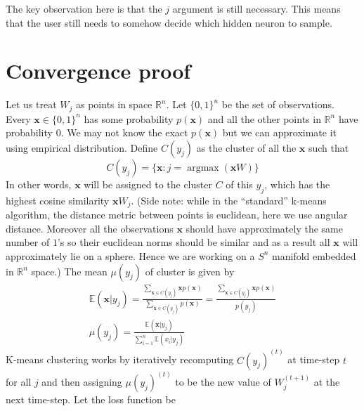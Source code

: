\documentclass[12pt]{article}
\DeclareMathOperator*{\argmax}{argmax}
\begin{document}
The key observation here is that the $j$ argument is still necessary. This means that the user still needs to somehow decide which hidden neuron to sample.



\section{Convergence proof}

Let us treat $W_j$ as points in space $\mathbb{R}^n$. Let $\{0,1\}^n$  be the set of observations. Every $\boldsymbol{x}\in \{0,1\}^n$ has some probability $p(\boldsymbol{x})$ and all the other points in $\mathbb{R}^n$ have probability $0$. We may not know the exact $p(\boldsymbol{x})$ but we can approximate it using empirical distribution. Define $C(y_j)$ as the cluster of all the $\boldsymbol{x}$ such that
\[
 C(y_j) = \{\boldsymbol{x} :  j = \argmax(\boldsymbol{x} W) \} 
\]
In other words, $\boldsymbol{x}$ will be assigned to the cluster $C$ of this  $y_j$, which has the highest cosine similarity $\boldsymbol{x}W_j$. (Side note: while in the ``standard'' k-means algorithm, the distance metric between points is euclidean, here we use angular distance. Moreover all the observations $\boldsymbol{x}$ should have approximately the same number of $1$'s so their euclidean norms should be similar and as a result all $\boldsymbol{x}$ will approximately lie on a sphere.  Hence we are working on a $S^n$ manifold embedded in $\mathbb{R}^n$ space.)  The mean $\mu(y_j)$ of cluster is given by 
\begin{gather*}
	\mathbb{E}(\boldsymbol{x}|y_j) = \frac{\sum_{\boldsymbol{x}\in C(y_j)} \boldsymbol{x}p(\boldsymbol{x})}{\sum_{\boldsymbol{x}\in C(y_j)} p(\boldsymbol{x})} = \frac{\sum_{\boldsymbol{x}\in C(y_j)} \boldsymbol{x}p(\boldsymbol{x})}{p(y_j)} \\
	\mu(y_j)  = \frac{\mathbb{E}(\boldsymbol{x}|y_j)}{\sum_{ï=1}^{n}\mathbb{E}(x_{ï}|y_j)}
\end{gather*}
K-means clustering works by iteratively recomputing $C(y_j)^{(t)}$ at time-step $t$ for all $j$ and then assigning $\mu(y_j)^{(t)}$ to be the new value of $W_j^{(t+1)}$ at the next time-step. Let the loss function be
\end{document}
